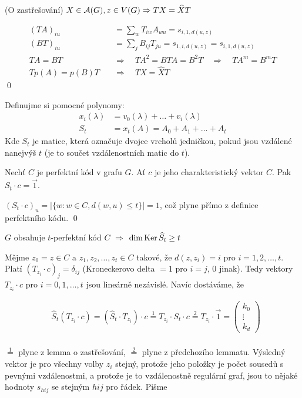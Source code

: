 \lm (O zastřešování) $X\in\mathcal{A}(G), z\in V(G) \Rightarrow TX = \widehat XT$

\dk 
\begin{align*}
(TA)_{iu} &= \sum_w T_{iw}A_{wu} = s_{i,1,d(u,z)} \\
(BT)_{iu} &= \sum_j B_{ij}T_{ju} = s_{1,i,d(u,z)}=s_{i,1,d(u,z)} \\
TA = BT \quad&\Rightarrow\quad TA^2 = BTA = B^2T \quad\Rightarrow\quad TA^m = B^mT \\
Tp(A) = p(B)T \quad&\Rightarrow\quad TX = \widehat XT
\end{align*}
\qed

\df Definujme si pomocné polynomy: 
\begin{align*}
	x_i(\lambda) &= v_0(\lambda) + \dots + v_i(\lambda) \\
  S_t &= x_t(A) = A_0 + A_1 + \dots + A_t
\end{align*}
Kde $S_t$ je matice, která označuje dvojce vrcholů jedničkou, pokud jsou vzdálené nanejvýš $t$ (je to součet vzdálenostních matic do $t$).

\lm Nechť $C$ je perfektní kód v grafu $G$. Ať $c$ je jeho charakteristický vektor $C$. Pak $S_t\cdot c = \vec 1$.

\dk $(S_t\cdot c)_u = |\{w: w\in C, d(w,u) \le t\}| = 1$, což plyne přímo z definice perfektního kódu.
\qed

\lm $G$ obsahuje $t$-perfektní kód $C$ $\Rightarrow$ $\dim \operatorname{Ker} \widehat S_t \ge t$

\dk Mějme $z_0 = z \in C$ a $z_1,z_2,\dots,z_t\in C$ takové, že $d(z,z_i) = i$ pro $i = 1, 2, \dots, t$.
Platí
$(T_{z_i} \cdot c)_j = \delta_{ij}$ (Kroneckerovo delta $= 1$ pro $i=j$, $0$ jinak). Tedy vektory $T_{z_i} \cdot c$ pro $i = 0, 1, \dots, t$ jsou lineárně nezávislé. Navíc dostáváme, že

\begin{align*}
	&\widehat S_t(T_{z_i}\cdot c) = (\widehat S_t \cdot T_{z_i}) \cdot c \overset{1}{=} T_{z_i} \cdot S_t \cdot c \overset{2}{=} T_{z_i}\cdot \vec 1 = \left(\begin{matrix}
		k_0 \\ \vdots \\ k_d
	\end{matrix}\right) \\
\end{align*}

$\overset{1}{=}$ plyne z lemma o zastřešování, $\overset{2}{=}$ plyne z předchozího lemmatu. Výsledný vektor je pro všechny volby $z_i$ stejný, protože jeho položky je počet sousedů s pevnými vzdálenostmi, a protože je to vzdálenostně regulární graf, jsou to nějaké hodnoty $s_{hij}$ se stejným $hij$ pro řádek. Pišme

